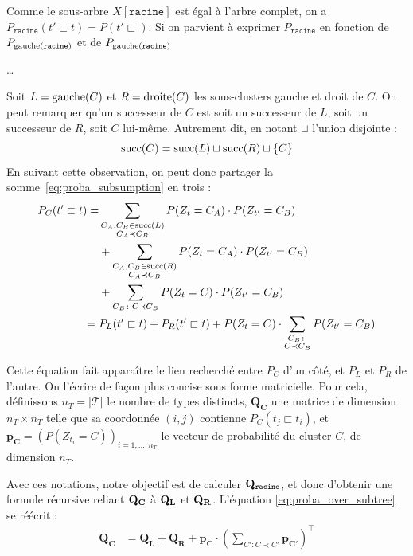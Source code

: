 Comme le sous-arbre $X[\texttt{racine}]$ est égal à l'arbre complet, on a $P_\texttt{racine}(t' \sqsubset t) = P(t' \sqsubset)$. Si on parvient à exprimer $P_\texttt{racine}$ en fonction de $P_{\gauche(\texttt{racine})}$ et de $P_{\gauche(\texttt{racine})}$

\ldots 
{}

Soit $L = \gauche(C)$ et $R = \droite(C)$ les sous-clusters gauche et droit de $C$. On peut remarquer qu'un successeur de $C$ est soit un successeur de $L$, soit un successeur de $R$, soit $C$ lui-même. Autrement dit, en notant $\sqcup$ l'union disjointe :
\begin{equation}
    \succs(C) = \succs(L) \sqcup \succs(R) \sqcup \{ C\}
\end{equation}
En suivant cette observation, on peut donc partager la somme~\ref{eq:proba_subsumption} en trois :
\begin{align}
P_{C}(t' \sqsubset t) = 
&
\sum_{\substack{C_A, C_B \in \succs(L) \\  C_A \prec C_B}} P(Z_t = C_A)\cdot P(Z_{t'} = C_B) 
\nonumber \\ 
&+ 
\sum_{\substack{C_A, C_B \in \succs(R) \\  C_A \prec C_B}} P(Z_t = C_A)\cdot P(Z_{t'} = C_B) 
\nonumber \\
&+ \displaystyle \sum_{C_B \colon C \prec C_B} P(Z_t = C) \cdot P(Z_{t'} = C_B) \nonumber \\
= {} & P_{L}(t' \sqsubset t) + P_{R}(t' \sqsubset t)  + P(Z_t=C)\cdot\sum_{\substack{C_B \colon \\ C\prec C_B}} P(Z_{t'} = C_B)
\label{eq:proba_over_subtree}
\end{align}

Cette équation fait apparaître le lien recherché entre $P_C$ d'un côté, et $P_L$ et $P_R$ de l'autre. On l'écrire de façon plus concise sous forme matricielle. Pour cela, définissons $n_T = | \mathcal{T} |$ le nombre de types distincts, $\mathbf{Q_C}$ une matrice de dimension $n_T \times n_T$ telle que sa coordonnée $(i, j)$ contienne $P_C(t_j \sqsubset t_i)$, et $\mathbf{p_C} = \left(P(Z_{t_i} = C)\right)_{i = 1, \ldots, n_T}$ le vecteur de probabilité du cluster $C$, de dimension $n_T$. 

Avec ces notations, notre objectif est de calculer $\bf{Q_\texttt{racine}}$, et donc d'obtenir une formule récursive reliant $\bf{Q_C}$ à $\bf{Q_L}$ et $\bf{Q_R}$. L'équation \ref{eq:proba_over_subtree} se réécrit :
\begin{align}
    \mathbf{Q_C} &= \mathbf{Q_L} + \mathbf{Q_R} + \mathbf{p_C} \cdot \left(\sum_{C' \colon C \prec C'} \mathbf{p_{C'}} \right)^\top 
    \label{eq:recursive_q_formula}
\end{align}

